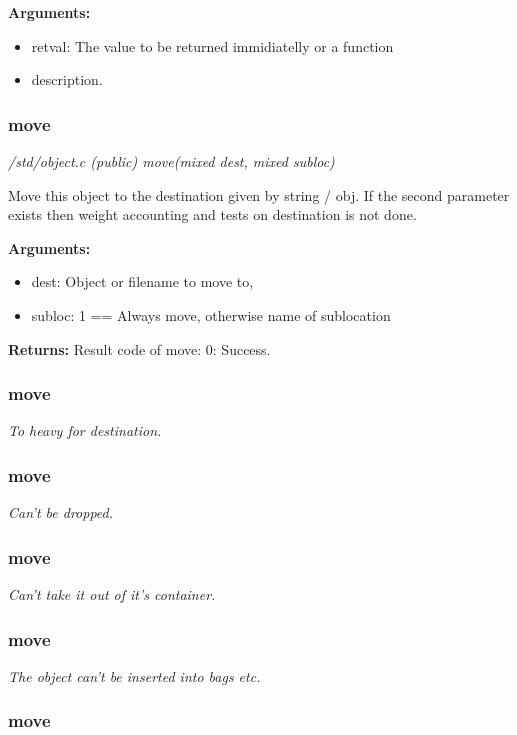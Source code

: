 {\bf Arguments:}
\begin{itemize}
\item      retval: The value to be returned immidiatelly or a function
\item description.
\end{itemize}


\subsubsection{move}

{\em /std/object.c (public) move(mixed dest, mixed subloc)}

Move this object to the destination given by string /
obj. If the second parameter exists then weight
accounting and tests on destination is not done.

{\bf Arguments:}
\begin{itemize}
\item     dest: Object or filename to move to,
\item subloc: 1 == Always move, otherwise name of sublocation
\end{itemize}

{\bf Returns:}        Result code of move:
                  0: Success.
\subsubsection{move}

{\em  To heavy for destination.}

\subsubsection{move}

{\em  Can't be dropped.}

\subsubsection{move}

{\em  Can't take it out of it's container.}

\subsubsection{move}

{\em  The object can't be inserted into bags etc.}

\subsubsection{move}

